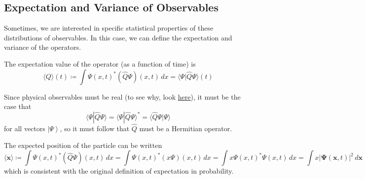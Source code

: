 \documentclass{article}
\newcommand{\ket}[1]{\ensuremath{\left|#1\right\rangle}}
\newcommand{\braket}[2]{\langle #1 | #2 \rangle}
\begin{document}
  \subsection{Expectation and Variance of Observables}

    Sometimes, we are interested in specific statistical properties of these distributions of observables. In this case, we can define the expectation and variance of the operators. 

    \begin{definition}
      \label{def:expectation-of-operator}
      The expectation value of the operator (as a function of time) is
      \begin{equation} 
        \langle Q \rangle (t) \coloneqq \int \Psi (x, t)^\ast (\hat{Q} \Psi) (x, t) \,dx = \braket{\Psi}{\hat{Q} \Psi}(t)
      \end{equation}
    \end{definition}

    Since physical observables must be real (to see why, look \href{https://physics.stackexchange.com/questions/436462/why-is-there-a-physical-preference-to-real-numbers}{here}), it must be the case that 
    \begin{equation} 
      \braket{\Psi}{\hat{Q} \Psi} = \braket{\Psi}{\hat{Q} \Psi}^\ast = \braket{\hat{Q} \Psi}{\Psi}
    \end{equation}
    for all vectors $\ket{\Psi}$, so it must follow that $\hat{Q}$ must be a Hermitian operator. 

    \begin{example}
      \label{ex:expectatation-of-position-observable}
      The expected position of the particle can be written
      \begin{equation} 
        \langle \mathbf{x} \rangle \coloneqq \int \Psi (x, t)^\ast (\hat{Q} \Psi)(x, t) \,dx = \int \Psi(x, t)^\ast (x \Psi)(x, t) \,dx = \int x \Psi (x, t)^\ast \Psi(x, t) \,dx = \int x |\boldsymbol{\Psi}(\mathbf{x}, t)|^2 \,d \mathbf{x}
      \end{equation} 
      which is consistent with the original definition of expectation in probability. 
    \end{example}
\end{document}

